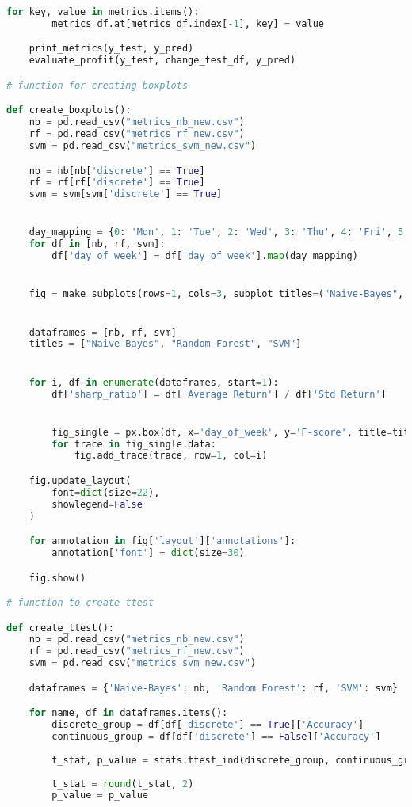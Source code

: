 \begin{lstlisting}[language=Python]
    for key, value in metrics.items():
        metrics_df.at[metrics_df.index[-1], key] = value

    print_metrics(y_test, y_pred)
    evaluate_profit(y_test, change_test_df, y_pred)

# function for creating boxplots

def create_boxplots():
    nb = pd.read_csv("metrics_nb_new.csv")
    rf = pd.read_csv("metrics_rf_new.csv")
    svm = pd.read_csv("metrics_svm_new.csv")

    nb = nb[nb['discrete'] == True]
    rf = rf[rf['discrete'] == True]
    svm = svm[svm['discrete'] == True]


    day_mapping = {0: 'Mon', 1: 'Tue', 2: 'Wed', 3: 'Thu', 4: 'Fri', 5: 'Saturday', 6: 'Sunday'}
    for df in [nb, rf, svm]:
        df['day_of_week'] = df['day_of_week'].map(day_mapping)


    fig = make_subplots(rows=1, cols=3, subplot_titles=("Naive-Bayes", "Random Forest", "SVM"))


    dataframes = [nb, rf, svm]
    titles = ["Naive-Bayes", "Random Forest", "SVM"]


    for i, df in enumerate(dataframes, start=1):
        df['sharp_ratio'] = df['Average Return'] / df['Std Return']


        fig_single = px.box(df, x='day_of_week', y='F-score', title=titles[i-1])
        for trace in fig_single.data:
            fig.add_trace(trace, row=1, col=i)

    fig.update_layout(
        font=dict(size=22),
        showlegend=False
    )

    for annotation in fig['layout']['annotations']:
        annotation['font'] = dict(size=30)

    fig.show()

# function to create ttest

def create_ttest():
    nb = pd.read_csv("metrics_nb_new.csv")
    rf = pd.read_csv("metrics_rf_new.csv")
    svm = pd.read_csv("metrics_svm_new.csv")

    dataframes = {'Naive-Bayes': nb, 'Random Forest': rf, 'SVM': svm}

    for name, df in dataframes.items():
        discrete_group = df[df['discrete'] == True]['Accuracy']
        continuous_group = df[df['discrete'] == False]['Accuracy']
        
        t_stat, p_value = stats.ttest_ind(discrete_group, continuous_group)
        
        t_stat = round(t_stat, 2)
        p_value = p_value
        

\end{lstlisting}
